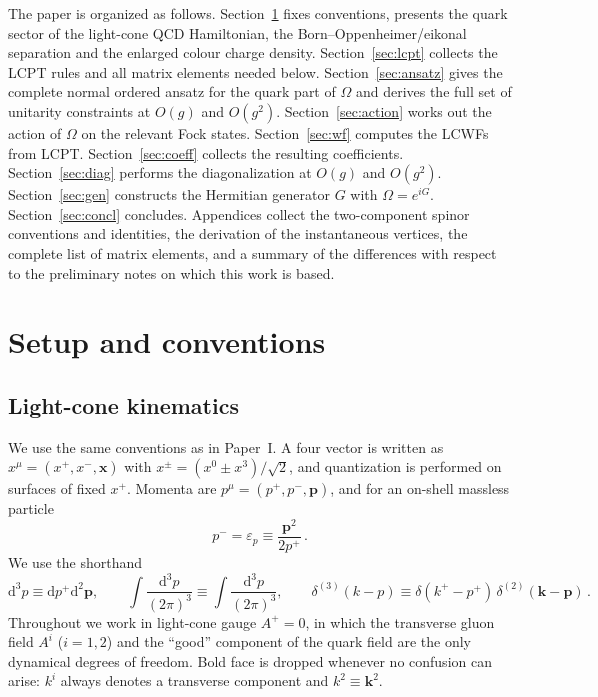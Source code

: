 \documentclass[11pt]{article}
\newcommand{\eps}{\varepsilon}
\newcommand{\dd}{\mathrm{d}}
\newcommand{\ip}[1]{\int\!\frac{\dd^3 #1}{(2\pi)^3}}
\newcommand{\dthree}{\delta^{(3)}}
\newcommand{\OM}{\Omega}
\begin{document}
The paper is organized as follows. Section~\ref{sec:setup} fixes conventions, presents the quark
sector of the light-cone QCD Hamiltonian, the Born--Oppenheimer/eikonal separation and the
enlarged colour charge density. Section~\ref{sec:lcpt} collects the LCPT rules and all matrix
elements needed below. Section~\ref{sec:ansatz} gives the complete normal ordered ansatz for the
quark part of $\OM$ and derives the full set of unitarity constraints at $O(g)$ and $O(g^2)$.
Section~\ref{sec:action} works out the action of $\OM$ on the relevant Fock states.
Section~\ref{sec:wf} computes the LCWFs from LCPT. Section~\ref{sec:coeff} collects the resulting
coefficients. Section~\ref{sec:diag} performs the diagonalization at $O(g)$ and $O(g^2)$.
Section~\ref{sec:gen} constructs the Hermitian generator $G$ with $\OM=e^{iG}$.
Section~\ref{sec:concl} concludes. Appendices collect the two-component spinor conventions and
identities, the derivation of the instantaneous vertices, the complete list of matrix elements,
and a summary of the differences with respect to the preliminary notes on which this work is based.

\section{Setup and conventions}
\label{sec:setup}

\subsection{Light-cone kinematics}

We use the same conventions as in Paper~I. A four vector is written as
$x^\mu=(x^+,x^-,\bm x)$ with $x^\pm=(x^0\pm x^3)/\sqrt2$, and quantization is performed on
surfaces of fixed $x^+$. Momenta are $p^\mu=(p^+,p^-,\bm p)$, and for an on-shell massless
particle
\begin{equation}
p^-=\eps_p\equiv \frac{\bm p^2}{2p^+}\,.
\end{equation}
We use the shorthand
\begin{equation}
\dd^3p\equiv \dd p^+\dd^2 \bm p,\qquad
\ip{p}\equiv\int\!\frac{\dd^3p}{(2\pi)^3},\qquad
\dthree(k-p)\equiv \delta(k^+-p^+)\,\delta^{(2)}(\bm k-\bm p)\,.
\end{equation}
Throughout we work in light-cone gauge $A^+=0$, in which the transverse gluon field $A^i$
($i=1,2$) and the ``good'' component of the quark field are the only dynamical degrees of freedom.
Bold face is dropped whenever no confusion can arise: $k^i$ always denotes a transverse component
and $k^2\equiv\bm k^2$.
\end{document}
